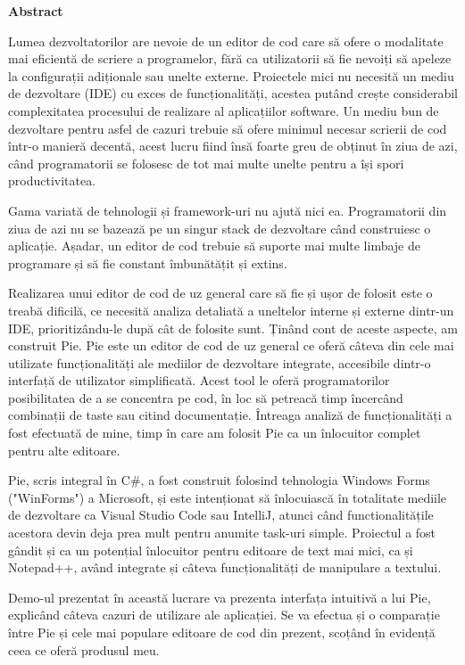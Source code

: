 \thispagestyle{pagestyle}

\begin{center}
    \textbf{\fontsize{20pt}{24pt} \selectfont Abstract}
\end{center}

Lumea dezvoltatorilor are nevoie de un editor de cod care să ofere o modalitate mai eficientă de scriere a programelor, fără ca utilizatorii să fie nevoiți să apeleze la configurații adiționale sau unelte externe. Proiectele mici nu necesită un mediu de dezvoltare (IDE) cu exces de funcționalități, acestea putând crește considerabil complexitatea procesului de realizare al aplicațiilor software. Un mediu bun de dezvoltare pentru asfel de cazuri trebuie să ofere minimul necesar scrierii de cod într-o manieră decentă, acest lucru fiind însă foarte greu de obținut în ziua de azi, când programatorii se folosesc de tot mai multe unelte pentru a își spori productivitatea.

Gama variată de tehnologii și framework-uri nu ajută nici ea. Programatorii din ziua de azi nu se bazează pe un singur stack de dezvoltare când construiesc o aplicație. Așadar, un editor de cod trebuie să suporte mai multe limbaje de programare și să fie constant îmbunătățit și extins.

Realizarea unui editor de cod de uz general care să fie și ușor de folosit este o treabă dificilă, ce necesită analiza detaliată a uneltelor interne și externe dintr-un IDE, prioritizându-le după cât de folosite sunt. Ținând cont de aceste aspecte, am construit Pie. Pie este un editor de cod de uz general ce oferă câteva din cele mai utilizate funcționalități ale mediilor de dezvoltare integrate, accesibile dintr-o interfață de utilizator simplificată. Acest tool le oferă programatorilor posibilitatea de a se concentra pe cod, în loc să petreacă timp încercând combinații de taste sau citind documentație. Întreaga analiză de funcționalități a fost efectuată de mine, timp în care am folosit Pie ca un înlocuitor complet pentru alte editoare.

Pie, scris integral în C\#, a fost construit folosind tehnologia Windows Forms ("WinForms") a Microsoft, și este intenționat să înlocuiască în totalitate mediile de dezvoltare ca Visual Studio Code sau IntelliJ, atunci când functionalitățile acestora devin deja prea mult pentru anumite task-uri simple. Proiectul a fost gândit și ca un potențial înlocuitor pentru editoare de text mai mici, ca și Notepad++, având integrate și câteva funcționalități de manipulare a textului.

Demo-ul prezentat în această lucrare va prezenta interfața intuitivă a lui Pie, explicând câteva cazuri de utilizare ale aplicației. Se va efectua și o comparație între Pie și cele mai populare editoare de cod din prezent, scoțând în evidență ceea ce oferă produsul meu.  

\vfill